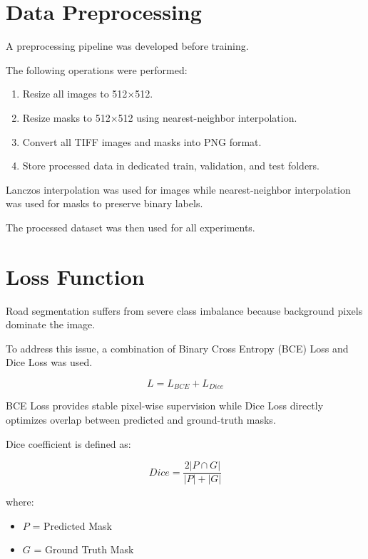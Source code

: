\documentclass[12pt]{article}
\begin{document}
\section{Data Preprocessing}

A preprocessing pipeline was developed before training.

The following operations were performed:

\begin{enumerate}
\item Resize all images to 512$\times$512.
\item Resize masks to 512$\times$512 using nearest-neighbor interpolation.
\item Convert all TIFF images and masks into PNG format.
\item Store processed data in dedicated train, validation, and test folders.
\end{enumerate}

Lanczos interpolation was used for images while nearest-neighbor interpolation was used for masks to preserve binary labels.

The processed dataset was then used for all experiments.

\section{Loss Function}

Road segmentation suffers from severe class imbalance because background pixels dominate the image.

To address this issue, a combination of Binary Cross Entropy (BCE) Loss and Dice Loss was used.

\begin{equation}
L = L_{BCE} + L_{Dice}
\end{equation}

BCE Loss provides stable pixel-wise supervision while Dice Loss directly optimizes overlap between predicted and ground-truth masks.

Dice coefficient is defined as:

\begin{equation}
Dice = \frac{2|P \cap G|}{|P| + |G|}
\end{equation}

where:

\begin{itemize}
\item $P$ = Predicted Mask
\item $G$ = Ground Truth Mask
\end{itemize}
\end{document}
